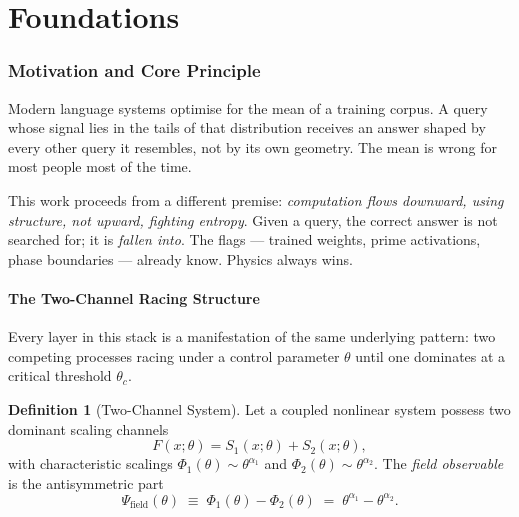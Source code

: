 \documentclass[11pt,twoside]{article}
\theoremstyle{plain}
\theoremstyle{definition}
\newtheorem{definition}[theorem]{Definition}
\theoremstyle{remark}
\begin{document}
\tableofcontents
\newpage

\part{Foundations}

\section{Motivation and Core Principle}

Modern language systems optimise for the mean of a training corpus.  A query
whose signal lies in the tails of that distribution receives an answer shaped by
every other query it resembles, not by its own geometry.  The mean is wrong for
most people most of the time.

This work proceeds from a different premise: \emph{computation flows downward,
using structure, not upward, fighting entropy}.  Given a query, the correct
answer is not searched for; it is \emph{fallen into}.  The flags --- trained
weights, prime activations, phase boundaries --- already know.  Physics always
wins.

\subsection{The Two-Channel Racing Structure}

Every layer in this stack is a manifestation of the same underlying pattern:
two competing processes racing under a control parameter $\theta$ until one
dominates at a critical threshold $\theta_c$.

\begin{definition}[Two-Channel System]\label{def:two-channel}
Let a coupled nonlinear system possess two dominant scaling channels
\begin{equation}
  F(x;\theta) = S_1(x;\theta) + S_2(x;\theta),
\end{equation}
with characteristic scalings $\Phi_1(\theta)\sim\theta^{\alpha_1}$ and
$\Phi_2(\theta)\sim\theta^{\alpha_2}$.  The \emph{field observable} is the
antisymmetric part
\begin{equation}\label{eq:field-obs}
  \varPsi_{\mathrm{field}}(\theta) \;\equiv\; \Phi_1(\theta) - \Phi_2(\theta)
  \;=\; \theta^{\alpha_1} - \theta^{\alpha_2}.
\end{equation}
\end{definition}
\end{document}

